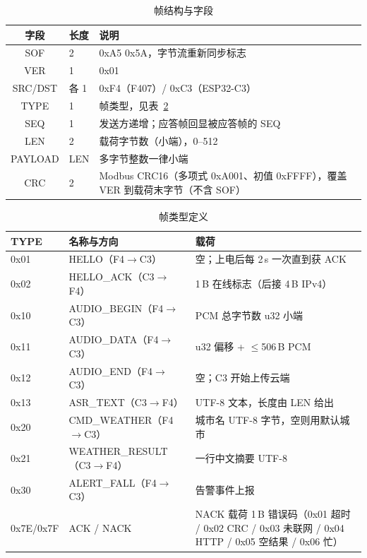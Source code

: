 \begin{table}[htbp]
\centering\small
\caption{帧结构与字段}\label{tab:frame}
\begin{tabular}{@{}clp{7.2cm}@{}}
\toprule
字段 & 长度 & 说明\\
\midrule
SOF & 2 & 0xA5 0x5A，字节流重新同步标志\\
VER & 1 & 0x01\\
SRC/DST & 各 1 & 0xF4（F407）/ 0xC3（ESP32-C3）\\
TYPE & 1 & 帧类型，见表~\ref{tab:types}\\
SEQ & 1 & 发送方递增；应答帧回显被应答帧的 SEQ\\
LEN & 2 & 载荷字节数（小端），0--512\\
PAYLOAD & LEN & 多字节整数一律小端\\
CRC & 2 & Modbus CRC16（多项式 0xA001、初值 0xFFFF），覆盖 VER 到载荷末字节（不含 SOF）\\
\bottomrule
\end{tabular}
\end{table}

\begin{table}[htbp]
\centering\small
\caption{帧类型定义}\label{tab:types}
\begin{tabular}{@{}llp{6.2cm}@{}}
\toprule
TYPE & 名称与方向 & 载荷\\
\midrule
0x01 & HELLO（F4$\to$C3） & 空；上电后每 2\,s 一次直到获 ACK\\
0x02 & HELLO\_ACK（C3$\to$F4） & 1\,B 在线标志（后接 4\,B IPv4）\\
0x10 & AUDIO\_BEGIN（F4$\to$C3） & PCM 总字节数 u32 小端\\
0x11 & AUDIO\_DATA（F4$\to$C3） & u32 偏移 + $\le$506\,B PCM\\
0x12 & AUDIO\_END（F4$\to$C3） & 空；C3 开始上传云端\\
0x13 & ASR\_TEXT（C3$\to$F4） & UTF-8 文本，长度由 LEN 给出\\
0x20 & CMD\_WEATHER（F4$\to$C3） & 城市名 UTF-8 字节，空则用默认城市\\
0x21 & WEATHER\_RESULT（C3$\to$F4） & 一行中文摘要 UTF-8\\
0x30 & ALERT\_FALL（F4$\to$C3） & 告警事件上报\\
0x7E/0x7F & ACK / NACK & NACK 载荷 1\,B 错误码（0x01 超时 / 0x02 CRC / 0x03 未联网 / 0x04 HTTP / 0x05 空结果 / 0x06 忙）\\
\bottomrule
\end{tabular}
\end{table}

